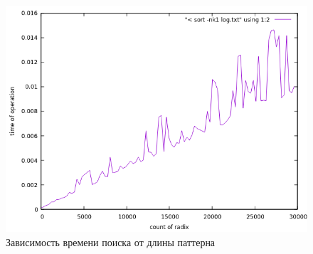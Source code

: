 \begin{figure}[h]
  \begin{center}
    \includegraphics[scale = 0.5]{../plots/find.png}
  \end{center}
  \caption{Зависимость времени поиска от длины паттерна}
\end{figure}


\pagebreak
